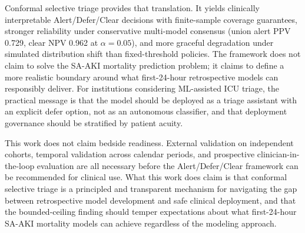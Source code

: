 Conformal selective triage provides that translation. It yields clinically interpretable Alert/Defer/Clear decisions with finite-sample coverage guarantees, stronger reliability under conservative multi-model consensus (union alert PPV 0.729, clear NPV 0.962 at $\alpha = 0.05$), and more graceful degradation under simulated distribution shift than fixed-threshold policies. The framework does not claim to solve the SA-AKI mortality prediction problem; it claims to define a more realistic boundary around what first-24-hour retrospective models can responsibly deliver. For institutions considering ML-assisted ICU triage, the practical message is that the model should be deployed as a triage assistant with an explicit defer option, not as an autonomous classifier, and that deployment governance should be stratified by patient acuity.

This work does not claim bedside readiness. External validation on independent cohorts, temporal validation across calendar periods, and prospective clinician-in-the-loop evaluation are all necessary before the Alert/Defer/Clear framework can be recommended for clinical use. What this work does claim is that conformal selective triage is a principled and transparent mechanism for navigating the gap between retrospective model development and safe clinical deployment, and that the bounded-ceiling finding should temper expectations about what first-24-hour SA-AKI mortality models can achieve regardless of the modeling approach.

